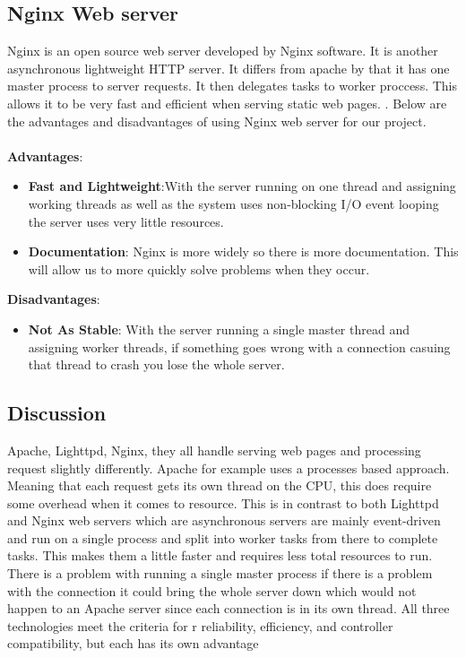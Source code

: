 	\subsection{Nginx Web server}
	Nginx is an open source web server developed by Nginx software. It is another
	asynchronous lightweight HTTP server. It differs from apache by that it has
	one master process to server requests. It then delegates tasks to worker
	proccess. This allows it to be very fast and efficient when serving static
	web pages. \cite{Nginx}. Below are the advantages and disadvantages
	of using Nginx web server for our project.
	\\\\
	\textbf{Advantages}:
	\begin{itemize}
		\item \textbf{Fast and Lightweight}:With the server running on one thread
		and assigning working threads as well as the system uses non-blocking I/O
		event looping the server uses very little resources.
		\item \textbf{Documentation}: Nginx is more widely so there is more documentation.
		This will allow us to more quickly solve problems when they occur.
	\end{itemize}
	\noindent\textbf{Disadvantages}:
	\begin{itemize}
		\item \textbf{Not As Stable}: With the server running a single master thread
		and assigning worker threads, if something goes wrong with a connection casuing
		that thread to crash you lose the whole server.
	\end{itemize}
	\subsection{Discussion}
	Apache, Lighttpd, Nginx, they all handle serving web pages and processing
	request slightly differently. Apache for example uses a processes based approach.
	Meaning that each request gets its own thread on the CPU, this does require
	some overhead when it comes to resource. This is in contrast to both Lighttpd
	and Nginx web servers which are asynchronous servers are mainly event-driven
	and run on a single process and split into worker tasks from there to complete
	tasks. This makes them a little faster and requires less total resources to run.
	There is a problem with running a single master process if there is a problem
	with the connection it could bring the whole server down which would not happen to an Apache server since each
	connection is in its own thread. All three technologies meet the criteria for r
	reliability, efficiency, and controller compatibility, but each has its own
	advantage
